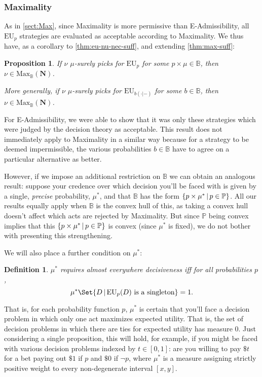 \documentclass[a4paper]{article}
\newtheorem{definition}{Definition}
\newtheorem{proposition}[theorem]{Proposition}
\newcommand\N{\mathbf{N}}
\renewcommand\P{\mathbb{P}} %
\newcommand\EU{\mathrm{EU}}
\newcommand\Maximality{\mathrm{Max}}
\newcommand{\IB}{\mathbb{B}}
\newcommand{\IP}{\P}
\newcommand{\pb}{b}
\renewcommand{\color}[1]{}
\newcommand\SetDelimiter[1][]{
	\nonscript\,#1\vert \allowbreak \nonscript\,\mathopen{}}
\providecommand\given{\SetDelimiter}
\newenvironment{CCM rewritten}
{\begingroup\color{blue}} %
{\endgroup}              %
\begin{document}
\subsubsection{Maximality}\label{sect:nu:Max}


As in \cref{sect:Max}, since Maximality is more permissive than E-Admissibility, all $\EU_p$ strategies are evaluated as acceptable according to Maximality. We thus have, as a corollary to \cref{thm:eu-nu-nec-suff}, and extending \cref{thm:max-suff}:
\begin{proposition}\label{thm:max-nu-suff}
		If $\nu$ $\mu$-surely picks for $\EU_{p}$ for some $p\times\mu\in \IB$, then $\nu\in\Maximality_\IB(\N)$. 
		
		More generally, if $\nu$ $\mu$-surely picks for $\EU_{\pb(\cdot|-)}$ for some $\pb\in \IB$, then $\nu\in\Maximality_\IB(\N)$. 
\end{proposition}

For E-Admissibility, we were able to show that it was only these strategies which were judged by the decision theory as acceptable. This result does not immediately apply to Maximality in a similar way because for a strategy to be deemed impermissible, the various probabilities $\pb\in \IB$ have to agree on a particular alternative as better.

However, if we impose an additional restriction on $\IB$ we can obtain an analogous result: suppose your credence over which decision you'll be faced with is given by a single, \emph{precise} probability, $\mu^*$, and that $\IB$ has the form $\{p\times \mu^*\given p\in \IP\}$. {\color{violet} All our results equally apply when $\IB$ is the convex hull of this, as taking a convex hull doesn't affect which acts are rejected by Maximality. But since $\IP$ being convex implies that this $\{p\times\mu^*\given p\in\IP\}$ is convex (since $\mu^*$ is fixed), we do not bother with presenting this strengthening. }


We will also place a further condition on $\mu^*$:
\begin{definition}\label{def:suff spread}
	$\mu^*$ \emph{requires almost everywhere decisiveness} iff for all probabilities $p$,$$\mu^*\Set{D\given \EU_p(D)\text{ is a singleton}}=1.$$ 
\end{definition}
That is, for each probability function $p$, $\mu^*$ is certain that you'll face a decision problem in which only one act maximizes expected utility. That is, the set of decision problems in which there are ties for expected utility has measure 0.
Just considering a single proposition, this will hold, for example, if you might be faced with various decision problems indexed by $t\in[0,1]$: are you willing to pay $\$t$ for a bet paying out $\$1$ if $p$ and $\$0$ if $\neg p$, where $\mu^*$ is a measure assigning strictly positive weight to every non-degenerate interval $[x,y]$. 
\end{document}
